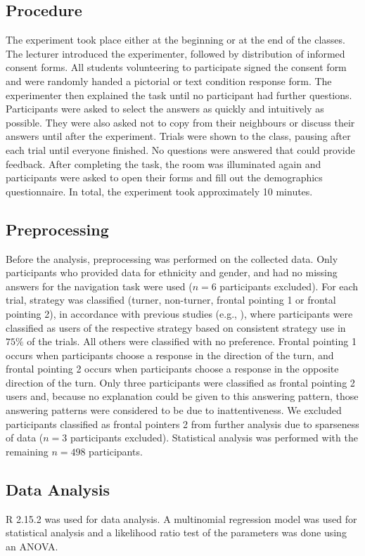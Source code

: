 \documentclass{frontiersSCNS} %
\begin{document}
\subsection{Procedure}
The experiment took place either at the beginning or at the end of the classes. The lecturer introduced the experimenter, followed by distribution of informed consent forms. All students volunteering to participate signed the consent form and were randomly handed a pictorial or text condition response form. The experimenter then explained the task until no participant had further questions. Participants were asked to select the answers as quickly and intuitively as possible. They were also asked not to copy from their neighbours or discuss their answers until after the experiment.
Trials were shown to the class, pausing after each trial until everyone finished. No questions were answered that could provide feedback.
After completing the task, the room was illuminated again and participants were asked to open their forms and fill out the demographics questionnaire. In total, the experiment took approximately 10 minutes.

\subsection{Preprocessing}
Before the analysis, preprocessing was performed on the collected data. Only participants who provided data for ethnicity and gender, and had no missing answers for the navigation task were used ($n = 6$ participants excluded). For each trial, strategy was classified (turner, non-turner, frontal pointing 1 or frontal pointing 2), in accordance with previous studies (e.g., \cite{Goeke2013}), where participants were classified as users of the respective strategy based on consistent strategy use in $75\%$ of the trials. All others were classified with no preference. Frontal pointing 1 occurs when participants choose a response in the direction of the turn, and frontal pointing 2 occurs when participants choose a response in the opposite direction of the turn. Only three participants were classified as frontal pointing 2 users and, because no explanation could be given to this answering pattern, those answering patterns were considered to be due to inattentiveness. We excluded participants classified as frontal pointers 2 from further analysis due to sparseness of data ($n = 3$ participants excluded). Statistical analysis was performed with the remaining $n = 498$ participants.

\subsection{Data Analysis}
R 2.15.2 was used for data analysis. A multinomial regression model was used for statistical analysis and a likelihood ratio test of the parameters was done using an ANOVA.
\end{document}
